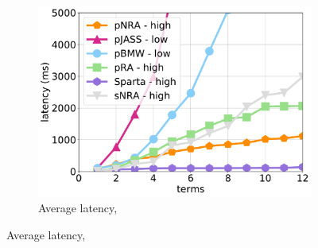 {{\begin{figure}[tbh]
\begin{subfigure}{0.325\textwidth}
    \includegraphics[width=\textwidth]{figures/latency_12threads_cluewebX10.pdf}
	\caption{Average latency, \cwten}
	        \label{fig:terms-scaling-10x-avg}
    \end{subfigure}
    
         


\end{figure}}}
